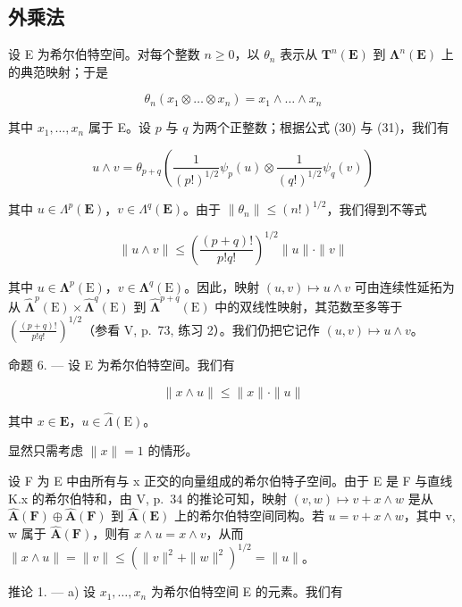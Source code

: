 \subsection{外乘法}

设 E 为希尔伯特空间。对每个整数 \(n \geqslant 0\)，以 \(\theta_{n}\) 表示从 \(\mathbf{T}^{n}(\mathbf{E})\) 到 \(\symbf{\Lambda}^{n}(\mathbf{E})\) 上的典范映射；于是

\[
\theta_ {n} (x _ {1} \otimes \ldots \otimes x _ {n}) = x _ {1} \wedge \ldots \wedge x _ {n}\tag{31}
\]

其中 \(x_{1}, \ldots, x_{n}\) 属于 E。设 \(p\) 与 \(q\) 为两个正整数；根据公式 (30) 与 (31)，我们有

\[
u \wedge v = \theta_ {p + q} \left(\frac {1}{(p !) ^ {1 / 2}} \psi_ {p} (u) \otimes \frac {1}{(q !) ^ {1 / 2}} \psi_ {q} (v)\right)\tag{32}
\]

其中 \(u \in \Lambda^p(\mathbf{E})\)，\(v \in \Lambda^q(\mathbf{E})\)。由于 \(\| \theta_n \| \leqslant (n!)^{1/2}\)，我们得到不等式

\[
\| u \wedge v \| \leqslant \left(\frac {(p + q) !}{p ! q !}\right) ^ {1 / 2} \| u \| \cdot \| v \|\tag{33}
\]

其中 \(u \in \symbf{\Lambda}^p(\mathrm{E})\)，\(v \in \symbf{\Lambda}^q(\mathrm{E})\)。因此，映射 \((u, v) \mapsto u \wedge v\) 可由连续性延拓为从 \(\hat{\symbf{\Lambda}}^p(\mathrm{E}) \times \hat{\symbf{\Lambda}}^q(\mathrm{E})\) 到 \(\hat{\symbf{\Lambda}}^{p + q}(\mathrm{E})\) 中的双线性映射，其范数至多等于 \(\left(\frac{(p + q)!}{p!q!}\right)^{1/2}\)（参看 V, p.~73, 练习 2）。我们仍把它记作 \((u, v) \mapsto u \wedge v\)。

命题 6. --- 设 E 为希尔伯特空间。我们有

\[
\| x \wedge u \| \leqslant \| x \| \cdot \| u \|\tag{34}
\]

其中 \(x\in \mathbf{E}\)，\(u\in \hat{\Lambda} (\mathrm{E})\)。

显然只需考虑 \(\| x\| = 1\) 的情形。

设 F 为 E 中由所有与 x 正交的向量组成的希尔伯特子空间。由于 E 是 F 与直线 K.x 的希尔伯特和，由 V, p.~34 的推论可知，映射 \((v,w)\mapsto v+x\wedge w\) 是从 \(\hat{\mathbf{A}}(\mathbf{F})\oplus\hat{\mathbf{A}}(\mathbf{F})\) 到 \(\hat{\mathbf{A}}(\mathbf{E})\) 上的希尔伯特空间同构。若 \(u=v+x\wedge w\)，其中 v, w 属于 \(\hat{\mathbf{A}}(\mathbf{F})\)，则有 \(x\wedge u=x\wedge v\)，从而 \(\|x\wedge u\|=\|v\|\leqslant(\|v\|^{2}+\|w\|^{2})^{1/2}=\|u\|\)。

推论 1. --- a) 设 \(x_1, \ldots, x_n\) 为希尔伯特空间 E 的元素。我们有

